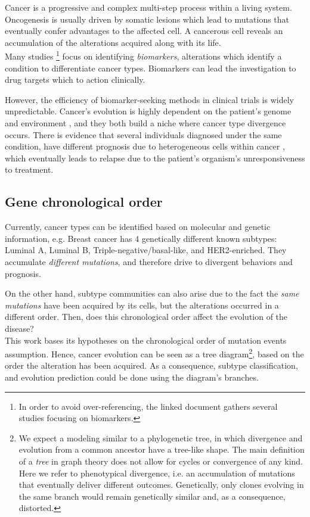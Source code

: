 Cancer is a progressive and complex multi-step process within a living system. Oncogenesis is usually driven by somatic lesions which lead to mutations that eventually confer advantages to the affected cell. A cancerous cell reveals an accumulation of the alterations acquired along with its life.
\\

Many studies \cite{Rifai2006ProteinUtility}\footnote{In order to avoid over-referencing, the linked document gathers several studies focusing on biomarkers.} focus on identifying \textit{biomarkers}, alterations which identify a condition to differentiate cancer types. Biomarkers can lead the investigation to drug targets which to action clinically.

However, the efficiency of biomarker-seeking methods in clinical trials is widely unpredictable. Cancer's evolution is highly dependent on the patient’s genome and environment \cite{Yates2012EvolutionGenome}, and they both build a niche where cancer type divergence occurs. There is evidence that several individuals diagnosed under the same condition, have different prognosis due to heterogeneous cells within cancer \cite{Gao2016LossTherapy} \cite{Zaretsky2016MutationsMelanoma}, which eventually leads to relapse due to the patient's organism's unresponsiveness to treatment.

\subsection{Gene chronological order}
Currently, cancer types can be identified based on molecular and genetic information, e.g. Breast cancer has 4 genetically different known subtypes: Luminal A, Luminal B, Triple-negative/basal-like, and HER2-enriched. They accumulate \textit{different mutations}, and therefore drive to divergent behaviors and prognosis.

On the other hand, subtype communities can also arise due to the fact the \textit{same mutations} have been acquired by its cells, but the alterations occurred in a different order.
Then, does this chronological order affect the evolution of the disease?
\\

This work bases its hypotheses on the chronological order of mutation events assumption. Hence, cancer evolution can be seen as a tree diagram\footnote{We expect a modeling similar to a phylogenetic tree, in which divergence and evolution from a common ancestor have a tree-like shape. The main definition of a \emph{tree} in graph theory does not allow for cycles or convergence of any kind. Here we refer to phenotypical divergence, i.e. an accumulation of mutations that eventually deliver different outcomes. Genetically, only clones evolving in the same branch would remain genetically similar and, as a consequence, distorted.}, based on the order the alteration has been acquired. As a consequence, subtype classification, and evolution prediction could be done using the diagram's branches.

